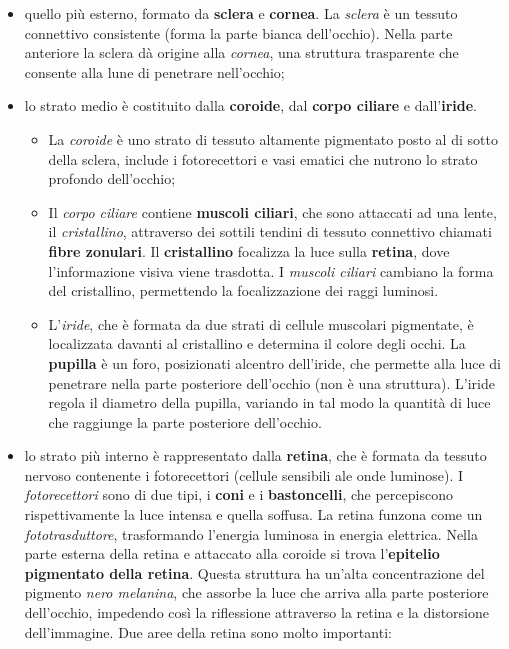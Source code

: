 \documentclass[]{article}
\begin{document}
\begin{itemize}
\itemsep1pt\parskip0pt
\item
  quello più esterno, formato da \textbf{sclera} e \textbf{cornea}. La
  \emph{sclera} è un tessuto connettivo consistente (forma la parte
  bianca dell'occhio). Nella parte anteriore la sclera dà origine alla
  \emph{cornea}, una struttura trasparente che consente alla lune di
  penetrare nell'occhio;
\item
  lo strato medio è costituito dalla \textbf{coroide}, dal \textbf{corpo
  ciliare} e dall'\textbf{iride}.

  \begin{itemize}
  \itemsep1pt\parskip0pt
  \item
    La \emph{coroide} è uno strato di tessuto altamente pigmentato posto
    al di sotto della sclera, include i fotorecettori e vasi ematici che
    nutrono lo strato profondo dell'occhio;
  \item
    Il \emph{corpo ciliare} contiene \textbf{muscoli ciliari}, che sono
    attaccati ad una lente, il \emph{cristallino}, attraverso dei
    sottili tendini di tessuto connettivo chiamati \textbf{fibre
    zonulari}. Il \textbf{cristallino} focalizza la luce sulla
    \textbf{retina}, dove l'informazione visiva viene trasdotta. I
    \emph{muscoli ciliari} cambiano la forma del cristallino,
    permettendo la focalizzazione dei raggi luminosi.
  \item
    L'\emph{iride}, che è formata da due strati di cellule muscolari
    pigmentate, è localizzata davanti al cristallino e determina il
    colore degli occhi. La \textbf{pupilla} è un foro, posizionati
    alcentro dell'iride, che permette alla luce di penetrare nella parte
    posteriore dell'occhio (non è una struttura). L'iride regola il
    diametro della pupilla, variando in tal modo la quantità di luce che
    raggiunge la parte posteriore dell'occhio.
  \end{itemize}
\item
  lo strato più interno è rappresentato dalla \textbf{retina}, che è
  formata da tessuto nervoso contenente i fotorecettori (cellule
  sensibili ale onde luminose). I \emph{fotorecettori} sono di due tipi,
  i \textbf{coni} e i \textbf{bastoncelli}, che percepiscono
  rispettivamente la luce intensa e quella soffusa. La retina funzona
  come un \emph{fototrasduttore}, trasformando l'energia luminosa in
  energia elettrica. Nella parte esterna della retina e attaccato alla
  coroide si trova l'\textbf{epitelio pigmentato della retina}. Questa
  struttura ha un'alta concentrazione del pigmento \emph{nero melanina},
  che assorbe la luce che arriva alla parte posteriore dell'occhio,
  impedendo così la riflessione attraverso la retina e la distorsione
  dell'immagine. Due aree della retina sono molto importanti:


\end{itemize}
\end{document}
